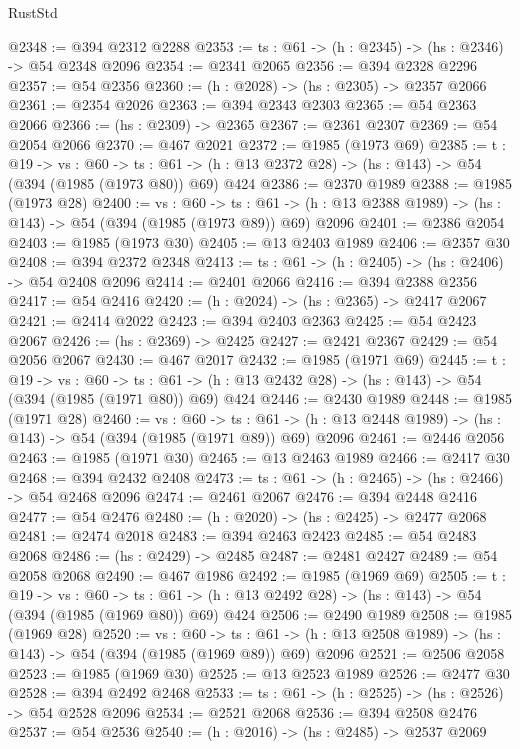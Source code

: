 \begin{lexlean}{RustStd}
\begin{coremodule}
{\begin{coremodule}
{{{{{{{{{{@2348 := @394 @2312 @2288
@2353 := {ts : @61} -> (h : @2345) -> (hs : @2346) -> @54 @2348 @2096
@2354 := @2341 @2065
@2356 := @394 @2328 @2296
@2357 := @54 @2356
@2360 := (h : @2028) -> (hs : @2305) -> @2357 @2066
@2361 := @2354 @2026
@2363 := @394 @2343 @2303
@2365 := @54 @2363 @2066
@2366 := (hs : @2309) -> @2365
@2367 := @2361 @2307
@2369 := @54 @2054 @2066
@2370 := @467 @2021
@2372 := @1985 (@1973 @69)
@2385 := {t : @19} ->
  {vs : @60} ->
  {ts : @61} -> (h : @13 @2372 @28) -> (hs : @143) -> @54 (@394 (@1985 (@1973 @80)) @69) @424
@2386 := @2370 @1989
@2388 := @1985 (@1973 @28)
@2400 := {vs : @60} ->
  {ts : @61} -> (h : @13 @2388 @1989) -> (hs : @143) -> @54 (@394 (@1985 (@1973 @89)) @69) @2096
@2401 := @2386 @2054
@2403 := @1985 (@1973 @30)
@2405 := @13 @2403 @1989
@2406 := @2357 @30
@2408 := @394 @2372 @2348
@2413 := {ts : @61} -> (h : @2405) -> (hs : @2406) -> @54 @2408 @2096
@2414 := @2401 @2066
@2416 := @394 @2388 @2356
@2417 := @54 @2416
@2420 := (h : @2024) -> (hs : @2365) -> @2417 @2067
@2421 := @2414 @2022
@2423 := @394 @2403 @2363
@2425 := @54 @2423 @2067
@2426 := (hs : @2369) -> @2425
@2427 := @2421 @2367
@2429 := @54 @2056 @2067
@2430 := @467 @2017
@2432 := @1985 (@1971 @69)
@2445 := {t : @19} ->
  {vs : @60} ->
  {ts : @61} -> (h : @13 @2432 @28) -> (hs : @143) -> @54 (@394 (@1985 (@1971 @80)) @69) @424
@2446 := @2430 @1989
@2448 := @1985 (@1971 @28)
@2460 := {vs : @60} ->
  {ts : @61} -> (h : @13 @2448 @1989) -> (hs : @143) -> @54 (@394 (@1985 (@1971 @89)) @69) @2096
@2461 := @2446 @2056
@2463 := @1985 (@1971 @30)
@2465 := @13 @2463 @1989
@2466 := @2417 @30
@2468 := @394 @2432 @2408
@2473 := {ts : @61} -> (h : @2465) -> (hs : @2466) -> @54 @2468 @2096
@2474 := @2461 @2067
@2476 := @394 @2448 @2416
@2477 := @54 @2476
@2480 := (h : @2020) -> (hs : @2425) -> @2477 @2068
@2481 := @2474 @2018
@2483 := @394 @2463 @2423
@2485 := @54 @2483 @2068
@2486 := (hs : @2429) -> @2485
@2487 := @2481 @2427
@2489 := @54 @2058 @2068
@2490 := @467 @1986
@2492 := @1985 (@1969 @69)
@2505 := {t : @19} ->
  {vs : @60} ->
  {ts : @61} -> (h : @13 @2492 @28) -> (hs : @143) -> @54 (@394 (@1985 (@1969 @80)) @69) @424
@2506 := @2490 @1989
@2508 := @1985 (@1969 @28)
@2520 := {vs : @60} ->
  {ts : @61} -> (h : @13 @2508 @1989) -> (hs : @143) -> @54 (@394 (@1985 (@1969 @89)) @69) @2096
@2521 := @2506 @2058
@2523 := @1985 (@1969 @30)
@2525 := @13 @2523 @1989
@2526 := @2477 @30
@2528 := @394 @2492 @2468
@2533 := {ts : @61} -> (h : @2525) -> (hs : @2526) -> @54 @2528 @2096
@2534 := @2521 @2068
@2536 := @394 @2508 @2476
@2537 := @54 @2536
@2540 := (h : @2016) -> (hs : @2485) -> @2537 @2069
}}}}}}}}}}
\end{coremodule}}
\end{coremodule}
\end{lexlean}
